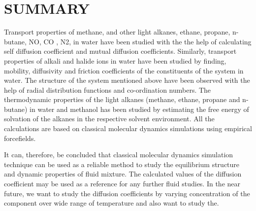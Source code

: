 \chapter{SUMMARY} \label{chap:6}
Transport  properties of methane, and other light alkanes, ethane, propane, n-butane,  NO, CO , N2, in water have been studied with the  the help of calculating  self diffusion coefficient and mutual diffusion coefficients. Similarly, transport properties of alkali and halide ions in water have been studied by finding, mobility, diffusivity and friction coefficients of the constituents of the system in water. The structure of the system mentioned above have been  observed with the help of radial distribution functions and co-ordination numbers. The thermodynamic properties of the light alkanes 
(methane, ethane, propane and n-butane) in water and methanol has been studied by estimating the free energy of solvation of the alkanes in the respective solvent environment. All the calculations are based on  classical molecular dynamics simulations using empirical forcefields. 

 It can, therefore, be concluded that classical molecular dynamics simulation technique can be used as a reliable method to study the equilibrium structure and dynamic properties of fluid mixture. The calculated values of the diffusion coefficient may be used as a reference for any further fluid studies. In the near future, we want to study the diffusion coefficients by varying concentration of the component over wide range of temperature and also want to study the. 




 

